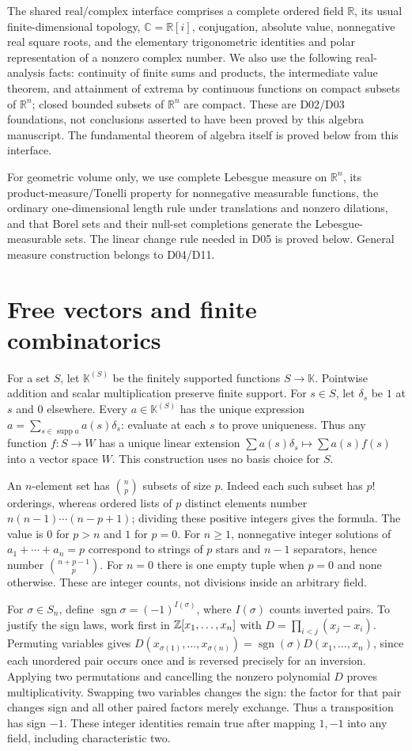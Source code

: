 \documentclass[11pt,a4paper]{book}
\theoremstyle{definition}\newtheorem{definition}[theorem]{Definition}
\theoremstyle{remark}\newtheorem{remark}[theorem]{Remark}
\newcommand{\K}{\mathbb K}\newcommand{\R}{\mathbb R}\newcommand{\C}{\mathbb C}
\begin{document}
The shared real/complex interface comprises a complete ordered field $\R$, its usual finite-dimensional topology, $\C=\R[i]$, conjugation, absolute value, nonnegative real square roots, and the elementary trigonometric identities and polar representation of a nonzero complex number. We also use the following real-analysis facts: continuity of finite sums and products, the intermediate value theorem, and attainment of extrema by continuous functions on compact subsets of $\R^n$; closed bounded subsets of $\R^n$ are compact. These are D02/D03 foundations, not conclusions asserted to have been proved by this algebra manuscript. The fundamental theorem of algebra itself is proved below from this interface.

For geometric volume only, we use complete Lebesgue measure on $\R^n$, its product-measure/Tonelli property for nonnegative measurable functions, the ordinary one-dimensional length rule under translations and nonzero dilations, and that Borel sets and their null-set completions generate the Lebesgue-measurable sets. The linear change rule needed in D05 is proved below. General measure construction belongs to D04/D11.

\section{Free vectors and finite combinatorics}
For a set $S$, let $\K^{(S)}$ be the finitely supported functions $S\to\K$. Pointwise addition and scalar multiplication preserve finite support. For $s\in S$, let $\delta_s$ be $1$ at $s$ and $0$ elsewhere. Every $a\in\K^{(S)}$ has the unique expression $a=\sum_{s\in\operatorname{supp}a}a(s)\delta_s$: evaluate at each $s$ to prove uniqueness. Thus any function $f:S\to W$ has a unique linear extension $\sum a(s)\delta_s\mapsto\sum a(s)f(s)$ into a vector space $W$. This construction uses no basis choice for $S$.

An $n$-element set has $\binom np$ subsets of size $p$. Indeed each such subset has $p!$ orderings, whereas ordered lists of $p$ distinct elements number $n(n-1)\cdots(n-p+1)$; dividing these positive integers gives the formula. The value is $0$ for $p>n$ and $1$ for $p=0$. For $n\ge1$, nonnegative integer solutions of $a_1+\cdots+a_n=p$ correspond to strings of $p$ stars and $n-1$ separators, hence number $\binom{n+p-1}{p}$. For $n=0$ there is one empty tuple when $p=0$ and none otherwise. These are integer counts, not divisions inside an arbitrary field.

For $\sigma\in S_n$, define $\operatorname{sgn}\sigma=(-1)^{I(\sigma)}$, where $I(\sigma)$ counts inverted pairs. To justify the sign laws, work first in $\mathbb Z[x_1,\ldots,x_n]$ with $D=\prod_{i<j}(x_j-x_i)$. Permuting variables gives $D(x_{\sigma(1)},\ldots,x_{\sigma(n)})=\operatorname{sgn}(\sigma)D(x_1,\ldots,x_n)$, since each unordered pair occurs once and is reversed precisely for an inversion. Applying two permutations and cancelling the nonzero polynomial $D$ proves multiplicativity. Swapping two variables changes the sign: the factor for that pair changes sign and all other paired factors merely exchange. Thus a transposition has sign $-1$. These integer identities remain true after mapping $1,-1$ into any field, including characteristic two.
\end{document}
